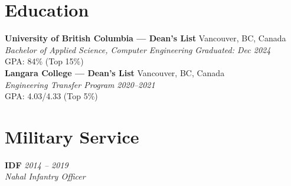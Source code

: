 \documentclass[11pt]{article}
\newcommand{\resumeSubheading}[4]{%
  \textbf{#1} \hfill #2\\
  \textit{#3} \hfill \textit{#4}\\
}
\begin{document}
\section{Education}
\resumeSubheading{University of British Columbia --- Dean's List}{Vancouver, BC, Canada}{Bachelor of Applied Science, Computer Engineering}{Graduated: Dec 2024}
GPA: 84\% (Top 15\%)\\
\resumeSubheading{Langara College --- Dean's List}{Vancouver, BC, Canada}{Engineering Transfer Program}{2020--2021}
GPA: 4.03/4.33 (Top 5\%)

\section{Military Service}
\textbf{IDF} \hfill \textit{2014 -- 2019}\\
\textit{Nahal Infantry Officer}
\end{document}
